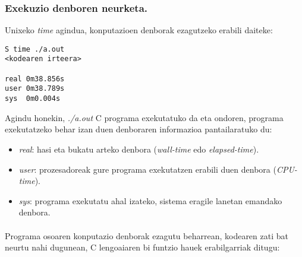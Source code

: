 \subsubsection*{Exekuzio denboren neurketa.}

Unixeko \emph{time} agindua, konputazioen denborak ezagutzeko erabili daiteke:

\begin{lstlisting} 
S time ./a.out
<kodearen irteera>

real 0m38.856s
user 0m38.789s
sys  0m0.004s
\end{lstlisting}

Agindu honekin, \emph{./a.out} C programa exekutatuko da eta ondoren, programa exekutatzeko behar izan duen denboraren informazioa pantailaratuko du:
\begin{itemize}
\item  \emph{real}: hasi eta bukatu arteko denbora (\emph{wall-time} edo \emph{elapsed-time}).
\item \emph{user}:  prozesadoreak gure programa exekutatzen erabili duen denbora (\emph{CPU-time}).
\item \emph{sys}:  programa exekutatu ahal izateko, sistema eragile lanetan emandako denbora. 
\end{itemize}

\paragraph*{} Programa osoaren konputazio denborak ezagutu beharrean, kodearen zati bat neurtu nahi dugunean, C lengoaiaren bi funtzio hauek erabilgarriak ditugu:

